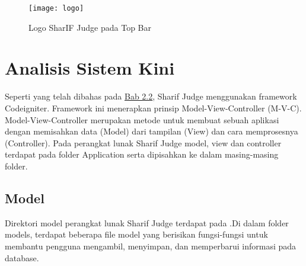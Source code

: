 \begin{figure}[H]
	\centering  
	\texttt{[image: logo]}  
	\caption[Logo SharIF Judge pada Top Bar]{Logo SharIF Judge pada Top Bar} 
	\label{fig:logo} 
\end{figure} 

\pagebreak

\section{Analisis Sistem Kini}

Seperti yang telah dibahas pada \hyperref[sec:sharifjudge]{Bab 2.2}, Sharif Judge menggunakan framework Codeigniter. Framework ini menerapkan prinsip Model-View-Controller (M-V-C). Model-View-Controller merupakan metode untuk membuat sebuah aplikasi dengan memisahkan data (Model) dari tampilan (View) dan cara memprosesnya (Controller). Pada perangkat lunak Sharif Judge model, view dan controller terdapat pada folder Application serta dipisahkan ke dalam masing-masing folder.  

\subsection{Model}
Direktori model perangkat lunak Sharif Judge terdapat pada .Di dalam folder models, terdapat beberapa file model yang berisikan fungsi-fungsi untuk membantu pengguna mengambil, menyimpan, dan memperbarui informasi pada database.

